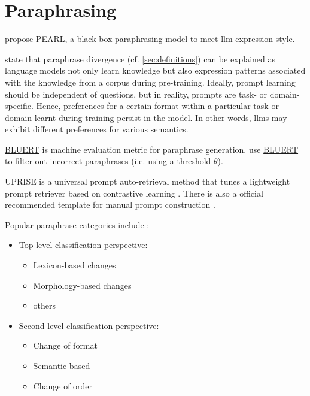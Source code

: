 \section{Paraphrasing}
\label{sec:paraphrasing}
\newcommand{\bluert}{\href{https://github.com/google-research/bleurt}{BLUERT}}

\citet{fu_learning_2024} propose PEARL, a black-box paraphrasing model to meet \ac{llm} expression style.

\citet{fu_learning_2024} state that paraphrase divergence (cf. \autoref{sec:definitions}) can be explained as language models 
not only learn knowledge but also expression patterns associated with the knowledge from a corpus during pre-training.
Ideally, prompt learning should be independent of questions, but in reality, prompts are task- or domain-specific.
Hence, preferences for a certain format within a particular task or domain learnt during training persist in the model.
In other words, \acp{llm} may exhibit different preferences for various semantics.

\bluert{} is machine evaluation metric for paraphrase generation.
\citet{fu_learning_2024} use \bluert{} to filter out incorrect paraphrases (i.e. using a threshold $\theta$).

UPRISE is a universal prompt auto-retrieval method that tunes a lightweight prompt retriever based on contrastive learning \cite{fu_learning_2024}.
There is also a official recommended template for manual prompt construction \cite{fu_learning_2024}.

Popular paraphrase categories include \cite{fu_learning_2024}:
\begin{itemize}
    \item Top-level classification perspective: 
        \begin{itemize}
            \item Lexicon-based changes
            \item Morphology-based changes
            \item others
        \end{itemize}
    \item Second-level classification perspective:
        \begin{itemize}
            \item Change of format
            \item Semantic-based
            \item Change of order
        \end{itemize}
\end{itemize}

